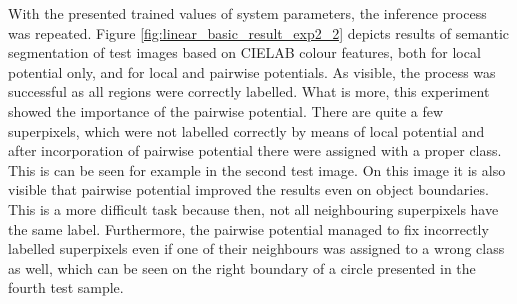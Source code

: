 With the presented trained values of system parameters, the inference process was repeated. Figure \ref{fig:linear_basic_result_exp2_2} depicts results of semantic segmentation of test images based on CIELAB colour features, both for local potential only, and for local and pairwise potentials. As visible, the process was successful as all regions were correctly labelled. What is more, this experiment showed the importance of the pairwise potential. There are quite a few superpixels, which were not labelled correctly by means of local potential and after incorporation of pairwise potential there were assigned with a proper class. This is can be seen for example in the second test image. On this image it is also visible that pairwise potential improved the results even on object boundaries. This is a more difficult task because then, not all neighbouring superpixels have the same label. Furthermore, the pairwise potential managed to fix incorrectly labelled superpixels even if one of their neighbours was assigned to a wrong class as well, which can be seen on the right boundary of a circle presented in the fourth test sample.
